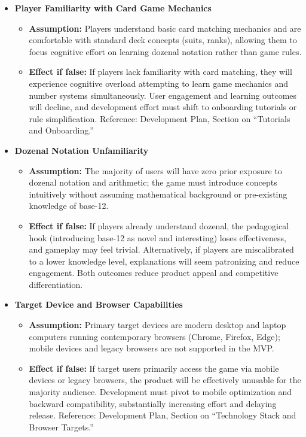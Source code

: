 \documentclass[12pt]{article}
\begin{document}
\begin{itemize}
    \item \textbf{Player Familiarity with Card Game Mechanics}
    \begin{itemize}
        \item \textbf{Assumption:} Players understand basic card matching mechanics and are comfortable with standard deck concepts (suits, ranks), allowing them to focus cognitive effort on learning dozenal notation rather than game rules.
        \item \textbf{Effect if false:} If players lack familiarity with card matching, they will experience cognitive overload attempting to learn game mechanics and number systems simultaneously. User engagement and learning outcomes will decline, and development effort must shift to onboarding tutorials or rule simplification. Reference: Development Plan, Section on ``Tutorials and Onboarding.''
    \end{itemize}

    \item \textbf{Dozenal Notation Unfamiliarity}
    \begin{itemize}
        \item \textbf{Assumption:} The majority of users will have zero prior exposure to dozenal notation and arithmetic; the game must introduce concepts intuitively without assuming mathematical background or pre-existing knowledge of base-12.
        \item \textbf{Effect if false:} If players already understand dozenal, the pedagogical hook (introducing base-12 as novel and interesting) loses effectiveness, and gameplay may feel trivial. Alternatively, if players are miscalibrated to a lower knowledge level, explanations will seem patronizing and reduce engagement. Both outcomes reduce product appeal and competitive differentiation.
    \end{itemize}
    
    \item \textbf{Target Device and Browser Capabilities}
    \begin{itemize}
        \item \textbf{Assumption:} Primary target devices are modern desktop and laptop computers running contemporary browsers (Chrome, Firefox, Edge); mobile devices and legacy browsers are not supported in the MVP.
        \item \textbf{Effect if false:} If target users primarily access the game via mobile devices or legacy browsers, the product will be effectively unusable for the majority audience. Development must pivot to mobile optimization and backward compatibility, substantially increasing effort and delaying release. Reference: Development Plan, Section on ``Technology Stack and Browser Targets.''
    \end{itemize}
    

\end{itemize}
\end{document}
